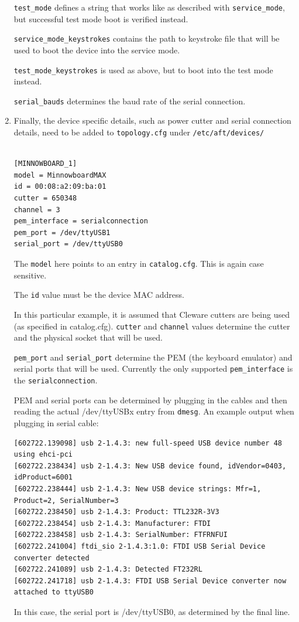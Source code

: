 \documentclass[a4paper,11pt]{article}
\newcommand{\cmd}[1]{\texttt{#1}}
\begin{document}
\begin{enumerate}
\cmd{test\_mode} defines a string that works like as described with \cmd{service\_mode}, but successful test mode boot is verified instead.

\cmd{service\_mode\_keystrokes} contains the path to keystroke file that will be used to boot the device into the service mode.

\cmd{test\_mode\_keystrokes} is used as above, but to boot into the test mode instead.

\cmd{serial\_bauds} determines the baud rate of the serial connection.

\item Finally, the device specific details, such as power cutter and serial connection details, need to be added to \cmd{topology.cfg} under \cmd{/etc/aft/devices/}

\begin{lstlisting}

[MINNOWBOARD_1]
model = MinnowboardMAX
id = 00:08:a2:09:ba:01
cutter = 650348
channel = 3
pem_interface = serialconnection
pem_port = /dev/ttyUSB1
serial_port = /dev/ttyUSB0

\end{lstlisting}
The \cmd{model} here points to an entry in \cmd{catalog.cfg}. This is again case sensitive.

The \cmd{id} value must be the device MAC address.

In this particular example, it is assumed that Cleware cutters are being used (as specified in catalog.cfg). \cmd{cutter} and \cmd{channel} values determine the cutter  and the physical socket that will be used.


\cmd{pem\_port} and \cmd{serial\_port} determine the PEM (the keyboard emulator) and serial ports that will be used. Currently the only supported \cmd{pem\_interface} is the \cmd{serialconnection}.

PEM and serial ports can be determined by plugging in the cables and then reading the actual /dev/ttyUSBx entry from \cmd{dmesg}. An example output when plugging in serial cable:

\begin{lstlisting}
[602722.139098] usb 2-1.4.3: new full-speed USB device number 48 using ehci-pci
[602722.238434] usb 2-1.4.3: New USB device found, idVendor=0403, idProduct=6001
[602722.238444] usb 2-1.4.3: New USB device strings: Mfr=1, Product=2, SerialNumber=3
[602722.238450] usb 2-1.4.3: Product: TTL232R-3V3
[602722.238454] usb 2-1.4.3: Manufacturer: FTDI
[602722.238458] usb 2-1.4.3: SerialNumber: FTFRNFUI
[602722.241004] ftdi_sio 2-1.4.3:1.0: FTDI USB Serial Device converter detected
[602722.241089] usb 2-1.4.3: Detected FT232RL
[602722.241718] usb 2-1.4.3: FTDI USB Serial Device converter now attached to ttyUSB0
\end{lstlisting}
In this case, the serial port is /dev/ttyUSB0, as determined by the final line.


\end{enumerate}
\end{document}
